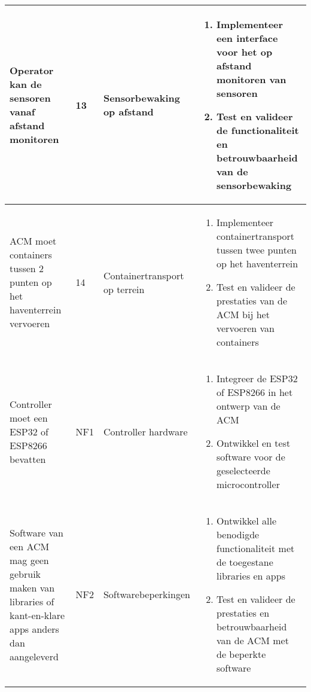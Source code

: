 \begin{longtable}{@{}p{4cm}p{2cm}p{3cm}p{5cm}@{}}
    Operator kan de sensoren vanaf afstand monitoren                                                       & 13           & Sensorbewaking op afstand     &
    \begin{enumerate}[nosep, leftmargin=*]
        \item Implementeer een interface voor het op afstand monitoren van sensoren
        \item Test en valideer de functionaliteit en betrouwbaarheid van de sensorbewaking \
    \end{enumerate}                                                                           \\
    \midrule

    ACM moet containers tussen 2 punten op het haventerrein vervoeren                                      & 14           & Containertransport op terrein &
    \begin{enumerate}[nosep, leftmargin=*]
        \item Implementeer containertransport tussen twee punten op het haventerrein
        \item Test en valideer de prestaties van de ACM bij het vervoeren van containers \
    \end{enumerate}                                                                             \\
    \midrule

    Controller moet een ESP32 of ESP8266 bevatten                                                          & NF1          & Controller hardware           &
    \begin{enumerate}[nosep, leftmargin=*]
        \item Integreer de ESP32 of ESP8266 in het ontwerp van de ACM
        \item Ontwikkel en test software voor de geselecteerde microcontroller \
    \end{enumerate}                                                                                       \\
    \midrule

    Software van een ACM mag geen gebruik maken van libraries of kant-en-klare apps anders dan aangeleverd & NF2          & Softwarebeperkingen           &
    \begin{enumerate}[nosep, leftmargin=*]
        \item Ontwikkel alle benodigde functionaliteit met de toegestane libraries en apps
        \item Test en valideer de prestaties en betrouwbaarheid van de ACM met de beperkte software \
    \end{enumerate}                                                                  \\
    \midrule


\end{longtable}
